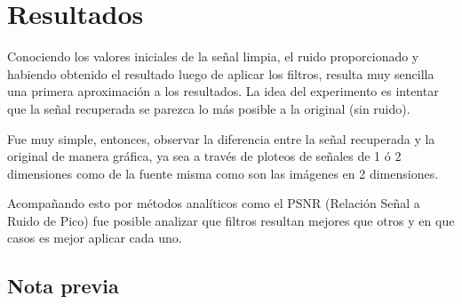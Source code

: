 \section{Resultados}

Conociendo los valores iniciales de la se\~nal limpia, el ruido proporcionado y
habiendo obtenido el resultado luego de aplicar los filtros, resulta muy
sencilla una primera aproximaci\'on a los resultados. La idea del experimento es
intentar que la se\~nal recuperada se parezca lo m\'as posible a la original
(sin ruido).

Fue muy simple, entonces, observar la diferencia entre la se\~nal recuperada y
la original de manera gr\'afica, ya sea a trav\'es de ploteos de se\~nales de 1
\'o 2 dimensiones como de la fuente misma como son las im\'agenes en 2
dimensiones.

Acompa\~nando esto por m\'etodos anal\'iticos como el PSNR (Relaci\'on Se\~nal a
Ruido de Pico) fue posible analizar que filtros resultan mejores que otros y en
que casos es mejor aplicar cada uno.

\subsection{Nota previa}


